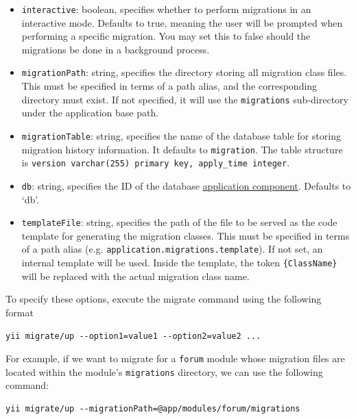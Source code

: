 \begin{itemize}
\item \lstinline|interactive|: boolean, specifies whether to perform migrations in an
interactive mode. Defaults to true, meaning the user will be prompted when
performing a specific migration. You may set this to false should the
migrations be done in a background process.


\item \lstinline|migrationPath|: string, specifies the directory storing all migration class
files. This must be specified in terms of a path alias, and the corresponding
directory must exist. If not specified, it will use the \lstinline|migrations|
sub-directory under the application base path.


\item \lstinline|migrationTable|: string, specifies the name of the database table for storing
migration history information. It defaults to \lstinline|migration|. The table
structure is \lstinline|version varchar(255) primary key, apply_time integer|.


\item \lstinline|db|: string, specifies the ID of the database \hyperref[structure-application-components.md]{application component}.
Defaults to `db'.


\item \lstinline|templateFile|: string, specifies the path of the file to be served as the code
template for generating the migration classes. This must be specified in terms
of a path alias (e.g. \lstinline|application.migrations.template|). If not set, an
internal template will be used. Inside the template, the token \lstinline|{ClassName}|
will be replaced with the actual migration class name.


\end{itemize}
To specify these options, execute the migrate command using the following format

\begin{lstlisting}
yii migrate/up --option1=value1 --option2=value2 ...
\end{lstlisting}
For example, if we want to migrate for a \lstinline|forum| module whose migration files
are located within the module's \lstinline|migrations| directory, we can use the following
command:

\begin{lstlisting}
yii migrate/up --migrationPath=@app/modules/forum/migrations
\end{lstlisting}
